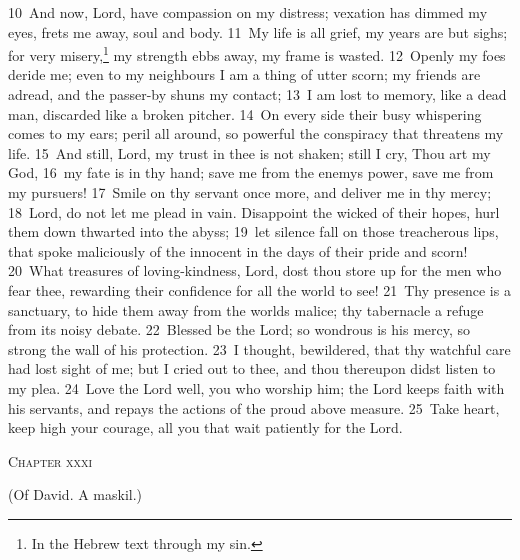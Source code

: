 \documentclass[10pt]{book} %
\begin{document}
\textcolor{benred8}{10}~And now, Lord, have compassion on my distress; vexation has dimmed my eyes, frets me away, soul and body. \textcolor{benred8}{11}~My life is all grief, my years are but sighs; for very misery,\footnote[1]{In the Hebrew text \textasciigrave through my sin\textquotesingle .} my strength ebbs away, my frame is wasted. \textcolor{benred8}{12}~Openly my foes deride me; even to my neighbours I am a thing of utter scorn; my friends are adread, and the passer-by shuns my contact; \textcolor{benred8}{13}~I am lost to memory, like a dead man, discarded like a broken pitcher. \textcolor{benred8}{14}~On every side their busy whispering comes to my ears; peril all around, so powerful the conspiracy that threatens my life. \textcolor{benred8}{15}~And still, Lord, my trust in thee is not shaken; still I cry, Thou art my God, \textcolor{benred8}{16}~my fate is in thy hand; save me from the enemy\textquotesingle s power, save me from my pursuers! \textcolor{benred8}{17}~Smile on thy servant once more, and deliver me in thy mercy; \textcolor{benred8}{18}~Lord, do not let me plead in vain. Disappoint the wicked of their hopes, hurl them down thwarted into the abyss; \textcolor{benred8}{19}~let silence fall on those treacherous lips, that spoke maliciously of the innocent in the days of their pride and scorn!
\textcolor{benred8}{20}~What treasures of loving-kindness, Lord, dost thou store up for the men who fear thee, rewarding their confidence for all the world to see! \textcolor{benred8}{21}~Thy presence is a sanctuary, to hide them away from the world\textquotesingle s malice; thy tabernacle a refuge from its noisy debate. \textcolor{benred8}{22}~Blessed be the Lord; so wondrous is his mercy, so strong the wall of his protection. \textcolor{benred8}{23}~I thought, bewildered, that thy watchful care had lost sight of me; but I cried out to thee, and thou thereupon didst listen to my plea. \textcolor{benred8}{24}~Love the Lord well, you who worship him; the Lord keeps faith with his servants, and repays the actions of the proud above measure. \textcolor{benred8}{25}~Take heart, keep high your courage, all you that wait patiently for the Lord.
\begin{large}\begin{center}\textsc{Chapter xxxi}\end{center}\end{large}
(Of David. A maskil.)
\end{document}
